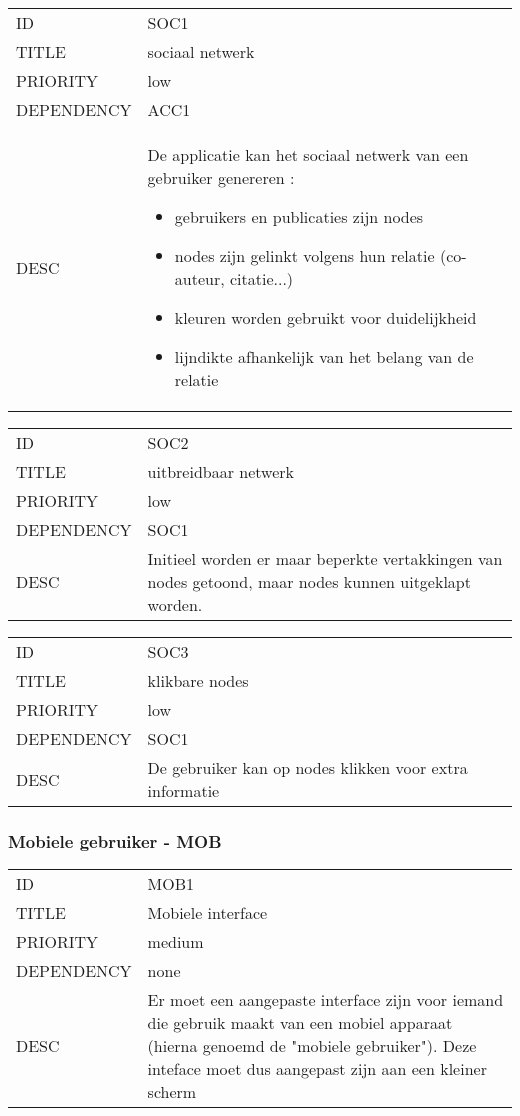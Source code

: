 \begin{longtable}{lp{10cm}}
ID           & SOC1\\
TITLE        & sociaal netwerk\\
PRIORITY     & low\\
DEPENDENCY   & ACC1\\
DESC         & De applicatie kan het sociaal netwerk van een gebruiker genereren :
\begin{itemize}
\item gebruikers en publicaties zijn nodes
\item nodes zijn gelinkt volgens hun relatie (co-auteur, citatie...)
\item kleuren worden gebruikt voor duidelijkheid
\item lijndikte afhankelijk van het belang van de relatie
\end{itemize}     
\end{longtable}

\begin{longtable}{lp{10cm}}
ID           & SOC2\\
TITLE        & uitbreidbaar netwerk\\
PRIORITY     & low\\
DEPENDENCY   & SOC1\\
DESC         & Initieel worden er maar beperkte vertakkingen van nodes getoond, maar nodes kunnen uitgeklapt worden.     
\end{longtable}

\begin{longtable}{lp{10cm}}
ID           & SOC3\\
TITLE        & klikbare nodes\\
PRIORITY     & low\\
DEPENDENCY   & SOC1\\
DESC         & De gebruiker kan op nodes klikken voor extra informatie     
\end{longtable}

\subsubsection{Mobiele gebruiker - MOB}

\begin{longtable}{lp{10cm}}
ID           & MOB1\\
TITLE        & Mobiele interface\\
PRIORITY     & medium\\
DEPENDENCY   & none\\
DESC         & Er moet een aangepaste interface zijn voor iemand die gebruik maakt van een mobiel apparaat (hierna                genoemd de "mobiele gebruiker"). Deze inteface moet dus aangepast zijn aan een kleiner scherm     
\end{longtable}

